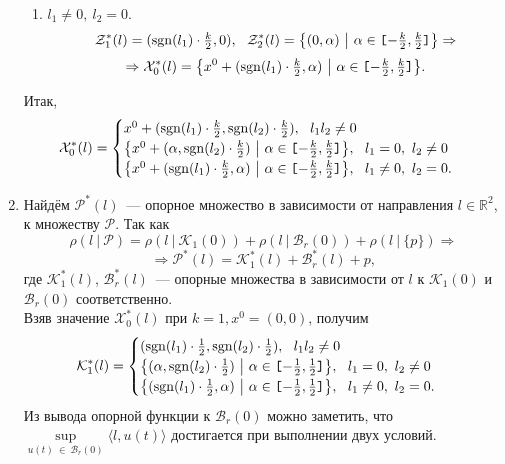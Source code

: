 \documentclass[a4paper,11pt]{article}
\begin{document}
\begin{enumerate}
\begin{enumerate}
\item $l_1 \neq 0,\  l_2 = 0$. 
\[ \mathcal{Z}_1^{*}(l) = (\sgn(l_1) \cdot \tfrac{k}{2}, 0), \ \ \mathcal{Z}_2^{*}(l) = \big{\{} (0, \alpha) \ \big{|} \  \alpha \in \texttt{[$-\tfrac{k}{2},\tfrac{k}{2}$]} \big{\}} \Rightarrow \]
\[ \Rightarrow \mathcal{X}_0^{*}(l) = \big{\{} x^0 + (\mathrm{sgn}(l_1) \cdot \tfrac{k}{2}, \alpha) \  \big{|} \ \alpha \in \texttt{[$-\tfrac{k}{2},\tfrac{k}{2}$]} \big{\}} . \]
\end{enumerate}
Итак, $$ \mathcal{X}_0^{*}(l) =
\begin{cases}
x^0 + (\sgn(l_1) \cdot \tfrac{k}{2}, \sgn(l_2) \cdot \tfrac{k}{2}), \ \ l_1 l_2 \neq 0 \\ 
\big{\{} x^0 + (\alpha, \sgn(l_2) \cdot \tfrac{k}{2}) \  \big{|} \ \alpha \in \texttt{[$-\tfrac{k}{2},\tfrac{k}{2}$]} \big{\}}, \ \ l_1 = 0,\  l_2 \neq 0 \\
\big{\{} x^0 + (\sgn(l_1) \cdot \tfrac{k}{2}, \alpha) \  \big{|} \ \alpha \in \texttt{[$-\tfrac{k}{2},\tfrac{k}{2}$]} \big{\}}, \ \ l_1 \neq 0, \ l_2 = 0.
\end{cases}$$


\item Найдём $\mathcal{P}^{*}(l)$~--- опорное множество в зависимости от направления $l \in \mathbb{R}^{2}$, к множеству $\mathcal{P}$. Так как
\[ \rho{(l \ | \ \mathcal{P})} = \rho{(l \ | \ \mathcal{K}_1(0))} + \rho{(l \ | \ \mathcal{B}_r(0))} + \rho{(l \ | \  \{p\})} \Rightarrow \]
\[ \Rightarrow \mathcal{P}^{*}(l) = \mathcal{K}_1^{*}(l) + \mathcal{B}_r^{*}(l) + p, \]
где $\mathcal{K}_1^{*}(l)$, $\mathcal{B}_r^{*}(l)$~--- опорные множества в зависимости от $l$ к $\mathcal{K}_1(0)$ и $\mathcal{B}_r(0)$ соответственно. \\
Взяв значение $\mathcal{X}_0^{*}(l)$ при $k = 1, x^0 = (0, 0)$, получим 
$$ \mathcal{K}_1^{*}(l) =
\begin{cases}
(\mathrm{sgn}(l_1) \cdot \tfrac{1}{2}, \mathrm{sgn}(l_2) \cdot \tfrac{1}{2}), \ \ l_1 l_2 \neq 0 \\ 
\big{\{} (\alpha, \mathrm{sgn}(l_2) \cdot \tfrac{1}{2}) \  \big{|} \ \alpha \in \texttt{[$-\tfrac{1}{2},\tfrac{1}{2}$]} \big{\}}, \ \ l_1 = 0, \  l_2 \neq 0 \\
\big{\{} (\mathrm{sgn}(l_1) \cdot \tfrac{1}{2}, \alpha) \  \big{|} \ \alpha \in \texttt{[$-\tfrac{1}{2},\tfrac{1}{2}$]} \big{\}}, \ \ l_1 \neq 0, \  l_2 = 0.
\end{cases}$$
Из вывода опорной функции к $\mathcal{B}_r(0)$ можно заметить, что $\sup\limits_{u(t) \ \in \ \mathcal{B}_r(0)}{\langle l, u(t) \rangle}$ достигается при выполнении двух условий.
\begin{enumerate}


\end{enumerate}
\end{enumerate}
\end{document}
